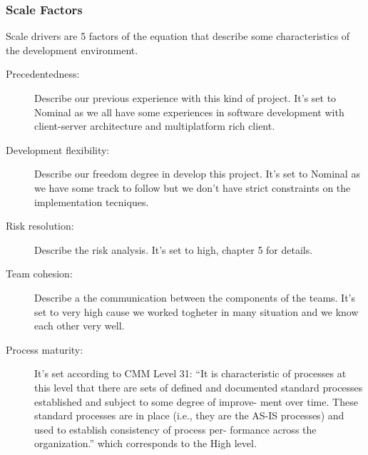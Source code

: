 \subsubsection{Scale Factors}

Scale drivers are 5 factors of the equation that describe some 
characteristics of the development environment.

\begin{description}

    \item[Precedentedness:] Describe our previous experience with this kind of project. It's set to Nominal as we all have some experiences in software development with client-server architecture and multiplatform rich client.

    \item[Development flexibility:] Describe our freedom degree in develop this project. It's set to Nominal as we have some track to follow but we don't have strict constraints on the implementation tecniques.

    \item[Risk resolution:] Describe the risk analysis. It's set to high, chapter 5 for details.

    \item[Team cohesion:] Describe a the communication between the components of the teams. It's set to very high cause we worked togheter in many situation and we know each other very well.

    \item[Process maturity:] It's set according to CMM Level 31: “It is characteristic of processes at this level that there are sets of defined and documented standard processes established and subject to some degree of improve- ment over time. These standard processes are in place (i.e., they are the AS-IS processes) and used to establish consistency of process per- formance across the organization.” which corresponds to the High level.

\end{description}


